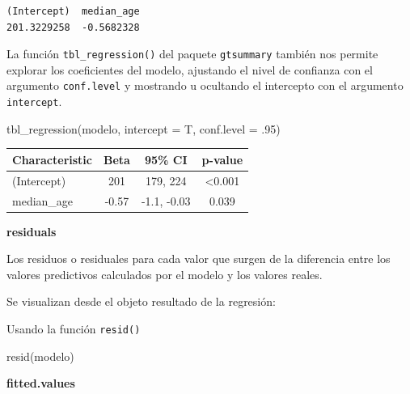 \documentclass[
  letterpaper,
  DIV=11,
  numbers=noendperiod]{scrartcl}
\newenvironment{Shaded}{\begin{snugshade}}{\end{snugshade}}
\newcommand{\AttributeTok}[1]{\textcolor[rgb]{0.40,0.45,0.13}{#1}}
\newcommand{\DecValTok}[1]{\textcolor[rgb]{0.68,0.00,0.00}{#1}}
\newcommand{\FunctionTok}[1]{\textcolor[rgb]{0.28,0.35,0.67}{#1}}
\newcommand{\NormalTok}[1]{\textcolor[rgb]{0.00,0.23,0.31}{#1}}
\newcommand{\SpecialCharTok}[1]{\textcolor[rgb]{0.37,0.37,0.37}{#1}}
\begin{document}
\begin{verbatim}
(Intercept)  median_age 
201.3229258  -0.5682328 
\end{verbatim}

La función \texttt{tbl\_regression()} del paquete \texttt{gtsummary}
también nos permite explorar los coeficientes del modelo, ajustando el
nivel de confianza con el argumento \texttt{conf.level} y mostrando u
ocultando el intercepto con el argumento \texttt{intercept}.

\begin{Shaded}
\begin{Highlighting}[]
\FunctionTok{tbl\_regression}\NormalTok{(modelo, }
               \AttributeTok{intercept =}\NormalTok{ T, }
               \AttributeTok{conf.level =}\NormalTok{ .}\DecValTok{95}\NormalTok{)}
\end{Highlighting}
\end{Shaded}

\begin{longtable}[]{@{}lccc@{}}
\toprule\noalign{}
\textbf{Characteristic} & \textbf{Beta} & \textbf{95\% CI} &
\textbf{p-value} \\
\midrule\noalign{}
\endhead
\bottomrule\noalign{}
\endlastfoot
(Intercept) & 201 & 179, 224 & \textless0.001 \\
median\_age & -0.57 & -1.1, -0.03 & 0.039 \\
\end{longtable}

\textbf{residuals}

Los residuos o residuales para cada valor que surgen de la diferencia
entre los valores predictivos calculados por el modelo y los valores
reales.

Se visualizan desde el objeto resultado de la regresión:

\begin{Shaded}
\end{Shaded}

Usando la función \texttt{resid()}

\begin{Shaded}
\begin{Highlighting}[]
\FunctionTok{resid}\NormalTok{(modelo)}
\end{Highlighting}
\end{Shaded}

\textbf{fitted.values}
\end{document}

